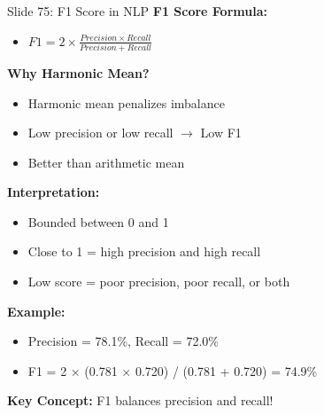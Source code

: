 \documentclass[8pt]{beamer}
\begin{document}
	\begin{frame}{Slide 75: F1 Score in NLP}
		\fontsize{6.5}{7.5}\selectfont
		\textbf{F1 Score Formula:}
		\begin{itemize}
			\item $F1 = 2 \times \frac{Precision \times Recall}{Precision + Recall}$
		\end{itemize}
		
		\vspace{0.1cm}
		\textbf{Why Harmonic Mean?}
		\begin{itemize}
			\item Harmonic mean penalizes imbalance
			\item Low precision or low recall $\to$ Low F1
			\item Better than arithmetic mean
		\end{itemize}
		
		\vspace{0.1cm}
		\textbf{Interpretation:}
		\begin{itemize}
			\item Bounded between 0 and 1
			\item Close to 1 = high precision and high recall
			\item Low score = poor precision, poor recall, or both
		\end{itemize}
		
		\vspace{0.1cm}
		\textbf{Example:}
		\begin{itemize}
			\item Precision = 78.1\%, Recall = 72.0\%
			\item F1 = 2 × (0.781 × 0.720) / (0.781 + 0.720) = 74.9\%
		\end{itemize}
		
		\textcolor{myblue}{\textbf{Key Concept:}} F1 balances precision and recall!
	\end{frame}
	
\end{document}
